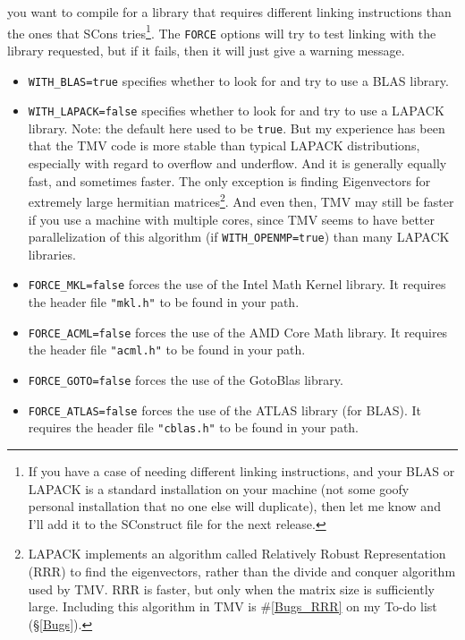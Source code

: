 \documentclass[twoside,letterpaper,11pt]{article}
\renewcommand{\tt}[1]{{\lstinline {#1}}}
\begin{document}
\begin{enumerate}
you want to compile for a library that requires different linking instructions than the 
ones that SCons tries\footnote{
If you have a case of needing different linking instructions, and your BLAS or LAPACK is a standard
installation on your machine (not some goofy personal installation that no one else will duplicate),
then let me know and I'll add it to the SConstruct file for the next release.}.
The \texttt{FORCE} options will try to test linking with the library requested,
but if it fails, then it will just give a warning message.
\begin{itemize}
\item \texttt{WITH\_BLAS=true} specifies whether to look for and try to use a BLAS library.
\item \texttt{WITH\_LAPACK=false} specifies whether to look for and try to use a LAPACK library.
Note: the default here used to be \tt{true}.  But my experience has been that the TMV code
is more stable than typical LAPACK distributions, especially with regard to overflow and 
underflow.  And it is generally equally fast, and sometimes faster.  The only exception is 
finding Eigenvectors for extremely large hermitian matrices\footnote{
LAPACK implements an algorithm called Relatively Robust Representation (RRR) to 
find the eigenvectors, rather than the divide and conquer algorithm used by TMV.
RRR is faster, but only when the matrix size is sufficiently large.  Including this algorithm 
in TMV is \#\ref{Bugs_RRR} on my To-do list (\S\ref{Bugs}).
}.  And even then, TMV may still be faster 
if you use a machine with multiple 
cores, since TMV seems to have better parallelization of this algorithm
 (if \tt{WITH_OPENMP=true}) than many LAPACK libraries.
\item \texttt{FORCE\_MKL=false} forces the use of the Intel Math Kernel library. 
It requires the header file \texttt{"mkl.h"} to be found in your path. 
\item \texttt{FORCE\_ACML=false} forces the use of the AMD Core Math library.  
It requires the header file \texttt{"acml.h"} to be found in your path.
\item \texttt{FORCE\_GOTO=false} forces the use of the GotoBlas library.  
\item \texttt{FORCE\_ATLAS=false} forces the use of the ATLAS library (for BLAS).  
It requires the header file \texttt{"cblas.h"} to be found in your path.

\end{itemize}
\end{enumerate}
\end{document}
